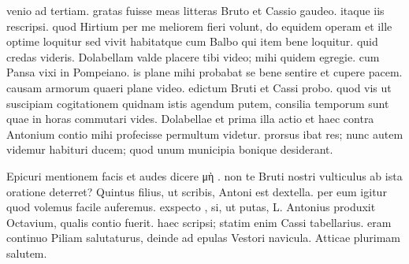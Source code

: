  venio ad tertiam. gratas fuisse meas litteras Bruto et Cassio gaudeo. itaque iis rescripsi. quod Hirtium per me meliorem fieri volunt, do equidem operam et ille optime loquitur sed vivit habitatque cum Balbo qui item bene loquitur. quid credas videris. Dolabellam valde placere tibi video; mihi quidem egregie. cum Pansa vixi in Pompeiano. is plane mihi probabat se bene sentire et cupere pacem. causam armorum quaeri plane video. edictum Bruti et Cassi probo. quod vis ut suscipiam cogitationem quidnam istis agendum putem, consilia temporum sunt quae in horas commutari vides. Dolabellae et prima illa actio et haec contra Antonium contio mihi profecisse permultum videtur. prorsus ibat res; nunc autem videmur habituri ducem; quod unum municipia bonique desiderant.

 Epicuri mentionem facis et audes dicere μὴ . non te Bruti nostri vulticulus ab ista oratione deterret? Quintus filius, ut scribis, Antoni est dextella. per eum igitur quod volemus facile auferemus. exspecto , si, ut putas, L. Antonius produxit Octavium, qualis contio fuerit. haec scripsi; statim enim Cassi tabellarius. eram continuo Piliam salutaturus, deinde ad epulas Vestori navicula. Atticae plurimam salutem.
